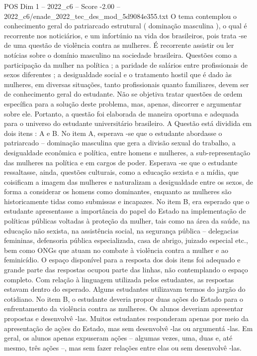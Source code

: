 \begin{textsample}{POS Dim 1 – 2022\_c6 – Score -2.00 – 2022\_c6/enade\_2022\_tec\_des\_mod\_5d9084e355.txt}
O tema contemplou o conhecimento geral do patriarcado estrutural ( dominação masculina ), o qual é recorrente nos noticiários, e um infortúnio na vida dos brasileiros, pois trata -se de uma questão de violência contra as mulheres.
É recorrente assistir ou ler notícias sobre o domínio masculino na sociedade brasileira.
Questões como a participação da mulher na política ; a paridade de salários entre profissionais de sexos diferentes ; a desigualdade social e o tratamento hostil que é dado às mulheres, em diversas situações, tanto profissionais quanto familiares, devem ser de conhecimento geral do estudante.
Não se objetiva tratar questões de ordem específica para a solução deste problema, mas, apenas, discorrer e argumentar sobre ele.
Portanto, a questão foi elaborada de maneira oportuna e adequada para o universo do estudante universitário brasileiro.
A Questão está dividida em dois itens : A e B.
No item A, esperava -se que o estudante abordasse o patriarcado – dominação masculina que gera a divisão sexual do trabalho, a desigualdade econômica e política, entre homens e mulheres, a sub-representação das mulheres na política e em cargos de poder.
Esperava -se que o estudante ressaltasse, ainda, questões culturais, como a educação sexista e a mídia, que coisificam a imagem das mulheres e naturalizam a desigualdade entre os sexos, de forma a considerar os homens como dominantes, enquanto as mulheres são historicamente tidas como submissas e incapazes.
No item B, era esperado que o estudante apresentasse a importância do papel do Estado na implementação de políticas públicas voltadas à proteção da mulher, tais como na área da saúde, na educação não sexista, na assistência social, na segurança pública – delegacias femininas, defensoria pública especializada, casa de abrigo, juizado especial etc., bem como ONGs que atuam no combate à violência contra a mulher e ao feminicídio.
O espaço disponível para a resposta dos dois itens foi adequado e grande parte das respostas ocupou parte das linhas, não contemplando o espaço completo.
Com relação à linguagem utilizada pelos estudantes, as respostas estavam dentro do esperado.
Alguns estudantes utilizavam termos do jargão do cotidiano.
No item B, o estudante deveria propor duas ações do Estado para o enfrentamento da violência contra as mulheres.
Os alunos deveriam apresentar propostas e desenvolvê -las.
Muitos estudantes responderam apenas por meio da apresentação de ações do Estado, mas sem desenvolvê -las ou argumentá -las.
Em geral, os alunos apenas expuseram ações – algumas vezes, uma, duas e, até mesmo, três ações –, mas sem fazer relações entre elas ou sem desenvolvê -las.

\end{textsample}
